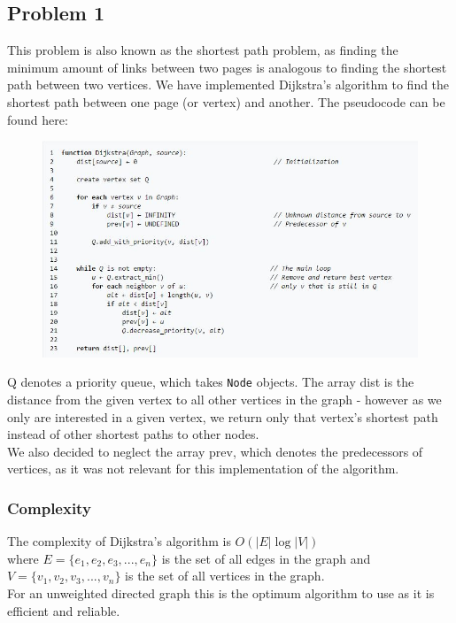 \documentclass[11pt]{article}
\begin{document}
	\subsection{Problem 1}
	This problem is also known as the shortest path problem, as finding the minimum amount of links between two pages is analogous to finding the shortest path between two vertices. We have implemented Dijkstra's algorithm to find the shortest path between one page (or vertex) and another. The pseudocode can be found here: \cite{dijkstra}
	\newpage
	\begin{figure}[h!]
		\centering
		\includegraphics[width=\linewidth]{images/dijkstra.jpg}
	\end{figure}
	Q denotes a priority queue, which takes \texttt{Node} objects. The array dist is the distance from the given vertex to all other vertices in the graph - however as we only are interested in a given vertex, we return only that vertex's shortest path instead of other shortest paths to other nodes.
	\\
	We also decided to neglect the array prev, which denotes the predecessors of vertices, as it was not relevant for this implementation of the algorithm.
	\subsubsection{Complexity}
	The complexity of Dijkstra's algorithm is \(O(|E|\log|V|)\) \\ where \(E = \{e_1,e_2,e_3,...,e_n\}\) is the set of all edges in the graph and \(V = \{v_1,v_2,v_3,...,v_n\}\) is the set of all vertices in the graph.
	\\
	For an unweighted directed graph this is the optimum algorithm to use as it is efficient and reliable.
\end{document}
